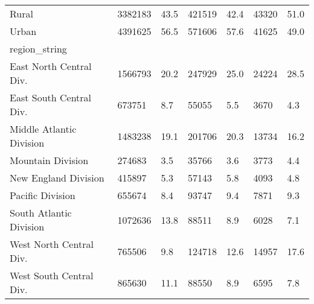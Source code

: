 \begin{longtable}{lllllll}
\midrule
Rural & 3382183 & 43.5 & 421519 & 42.4 & 43320 & 51.0 \\ 
Urban & 4391625 & 56.5 & 571606 & 57.6 & 41625 & 49.0 \\ 
\midrule
\multicolumn{1}{l}{region\_string} \\ 
\midrule
East North Central Div. & 1566793 & 20.2 & 247929 & 25.0 & 24224 & 28.5 \\ 
East South Central Div. & 673751 & 8.7 & 55055 & 5.5 & 3670 & 4.3 \\ 
Middle Atlantic Division & 1483238 & 19.1 & 201706 & 20.3 & 13734 & 16.2 \\ 
Mountain Division & 274683 & 3.5 & 35766 & 3.6 & 3773 & 4.4 \\ 
New England Division & 415897 & 5.3 & 57143 & 5.8 & 4093 & 4.8 \\ 
Pacific Division & 655674 & 8.4 & 93747 & 9.4 & 7871 & 9.3 \\ 
South Atlantic Division & 1072636 & 13.8 & 88511 & 8.9 & 6028 & 7.1 \\ 
West North Central Div. & 765506 & 9.8 & 124718 & 12.6 & 14957 & 17.6 \\ 
West South Central Div. & 865630 & 11.1 & 88550 & 8.9 & 6595 & 7.8 \\ 
\bottomrule
\end{longtable}

